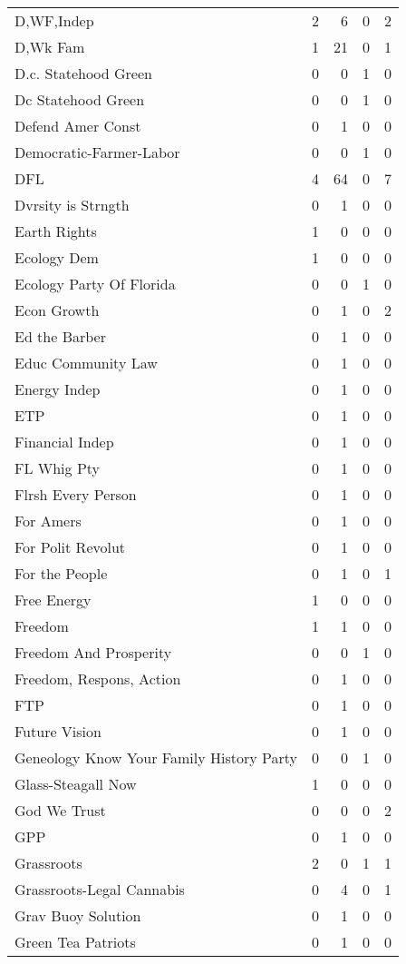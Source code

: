 \begin{supertabular}{lrrrr}
D,WF,Indep & 2 & 6 & 0 & 2\\
D,Wk Fam & 1 & 21 & 0 & 1\\
D.c. Statehood Green & 0 & 0 & 1 & 0\\
Dc Statehood Green & 0 & 0 & 1 & 0\\
Defend Amer Const & 0 & 1 & 0 & 0\\
Democratic-Farmer-Labor & 0 & 0 & 1 & 0\\
DFL & 4 & 64 & 0 & 7\\
Dvrsity is Strngth & 0 & 1 & 0 & 0\\
Earth Rights & 1 & 0 & 0 & 0\\
Ecology Dem & 1 & 0 & 0 & 0\\
Ecology Party Of Florida & 0 & 0 & 1 & 0\\
Econ Growth & 0 & 1 & 0 & 2\\
Ed the Barber & 0 & 1 & 0 & 0\\
Educ Community Law & 0 & 1 & 0 & 0\\
Energy Indep & 0 & 1 & 0 & 0\\
ETP & 0 & 1 & 0 & 0\\
Financial Indep & 0 & 1 & 0 & 0\\
FL Whig Pty & 0 & 1 & 0 & 0\\
Flrsh Every Person & 0 & 1 & 0 & 0\\
For Amers & 0 & 1 & 0 & 0\\
For Polit Revolut & 0 & 1 & 0 & 0\\
For the People & 0 & 1 & 0 & 1\\
Free Energy & 1 & 0 & 0 & 0\\
Freedom & 1 & 1 & 0 & 0\\
Freedom And Prosperity & 0 & 0 & 1 & 0\\
Freedom, Respons, Action & 0 & 1 & 0 & 0\\
FTP & 0 & 1 & 0 & 0\\
Future Vision & 0 & 1 & 0 & 0\\
Geneology Know Your Family History Party & 0 & 0 & 1 & 0\\
Glass-Steagall Now & 1 & 0 & 0 & 0\\
God We Trust & 0 & 0 & 0 & 2\\
GPP & 0 & 1 & 0 & 0\\
Grassroots & 2 & 0 & 1 & 1\\
Grassroots-Legal Cannabis & 0 & 4 & 0 & 1\\
Grav Buoy Solution & 0 & 1 & 0 & 0\\
Green Tea Patriots & 0 & 1 & 0 & 0\\

\end{supertabular}

